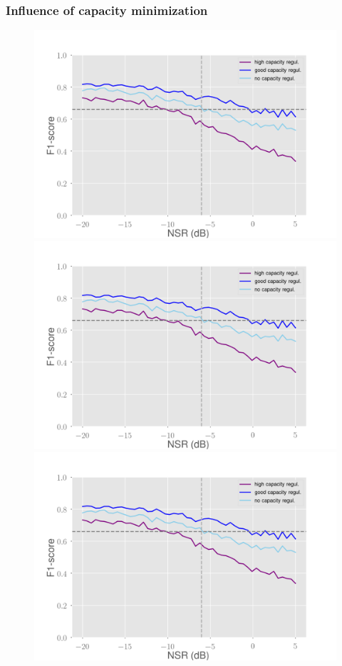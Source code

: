 \documentclass[10pt]{beamer}
\begin{document}
\begin{frame}
\frametitle{Influence of capacity minimization}
\begin{multicols}{2}
\begin{figure}
\centering
\begin{overprint}
    \includegraphics[scale=0.2]{figs/capacity-ip-noisy}
    \includegraphics[scale=0.2]{figs/capacity-ip-noisy}
    \includegraphics[scale=0.2]{figs/capacity-ip-noisy}

\end{overprint}
\end{figure}
\end{multicols}
\end{frame}
\end{document}
